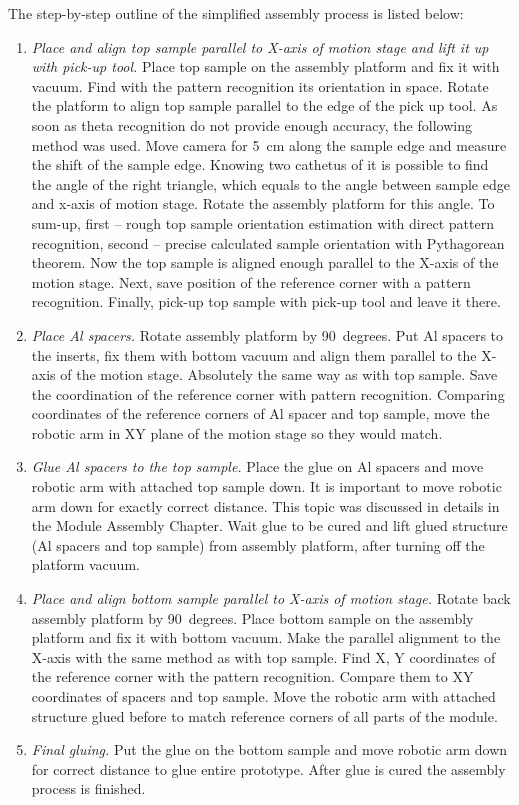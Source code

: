 The step-by-step outline of the simplified assembly process is listed below:

\begin{enumerate}
\setlength\itemsep{-0.5em}
\item \textit{Place and align top sample parallel to X-axis of motion stage and lift it up with pick-up tool.} Place top sample on the assembly platform and fix it with vacuum. Find with the pattern recognition its orientation in space. Rotate the platform to align top sample parallel to the edge of the pick up tool. As soon as theta recognition do not provide enough accuracy, the following method was used. Move camera for 5~cm along the sample edge and measure the shift of the sample edge. Knowing two cathetus of it is possible to find the angle of the right triangle, which equals to the angle between sample edge and x-axis of motion stage. Rotate the assembly platform for this angle. To sum-up, first -- rough top sample orientation estimation with direct pattern recognition, second -- precise calculated sample orientation with Pythagorean theorem. Now the top sample is aligned enough parallel to the X-axis of the motion stage. Next, save position of the reference corner with a pattern recognition. Finally, pick-up top sample with pick-up tool and leave it there.
\item \textit{Place Al spacers.} Rotate assembly platform by 90~degrees. Put Al spacers to the inserts, fix them with bottom vacuum and align them parallel to the X-axis of the motion stage. Absolutely the same way as with top sample. Save the coordination of the reference corner with pattern recognition. Comparing coordinates of the reference corners of Al spacer and top sample, move the robotic arm in XY plane of the motion stage so they would match.
\item \textit{Glue Al spacers to the top sample.} Place the glue on Al spacers and move robotic arm with attached top sample down. It is important to move robotic arm down for exactly correct distance. This topic was discussed in details in the Module Assembly Chapter. Wait glue to be cured and lift glued structure (Al spacers and top sample) from assembly platform, after turning off the platform vacuum.
\item \textit{Place and align bottom sample parallel to X-axis of motion stage.} Rotate back assembly platform by 90~degrees. Place bottom sample on the assembly platform and fix it with bottom vacuum. Make the parallel alignment to the X-axis with the same method as with top sample. Find X, Y coordinates of the reference corner with the pattern recognition. Compare them to XY coordinates of spacers and top sample. Move the robotic arm with attached structure glued before to match reference corners of all parts of the module.
\item \textit{Final gluing.} Put the glue on the bottom sample and move robotic arm down for correct distance to glue entire prototype. After glue is cured the assembly process is finished.
\end{enumerate}

